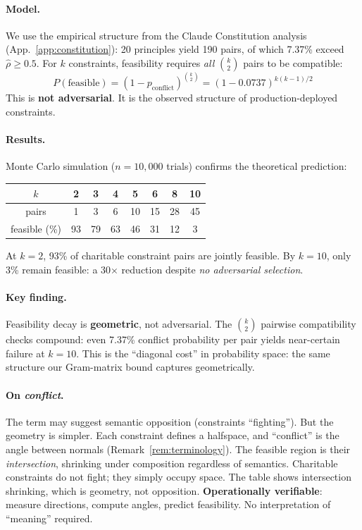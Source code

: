 \documentclass{article}
\theoremstyle{plain}
\theoremstyle{definition}
\theoremstyle{remark}
\newcommand{\rhohat}{\hat{\rho}}
\newcommand{\appref}[1]{App.~\ref{#1}}
\begin{document}
\paragraph{Model.} We use the empirical structure from the Claude Constitution analysis (\appref{app:constitution}): 20 principles yield 190 pairs, of which 7.37\% exceed $\rhohat \ge 0.5$. For $k$ constraints, feasibility requires \emph{all} $\binom{k}{2}$ pairs to be compatible:
\[
P(\text{feasible}) = (1 - p_{\text{conflict}})^{\binom{k}{2}} = (1 - 0.0737)^{k(k-1)/2}
\]
This is \textbf{not adversarial}. It is the observed structure of production-deployed constraints.

\paragraph{Results.} Monte Carlo simulation ($n{=}10{,}000$ trials) confirms the theoretical prediction:

\begin{center}
\begin{tabular}{c|ccccccc}
\toprule
$k$ & 2 & 3 & 4 & 5 & 6 & 8 & 10 \\
\midrule
pairs & 1 & 3 & 6 & 10 & 15 & 28 & 45 \\
feasible (\%) & 93 & 79 & 63 & 46 & 31 & 12 & 3 \\
\bottomrule
\end{tabular}
\end{center}

\noindent At $k{=}2$, 93\% of charitable constraint pairs are jointly feasible. By $k{=}10$, only 3\% remain feasible: a 30$\times$ reduction despite \emph{no adversarial selection}.

\paragraph{Key finding.} Feasibility decay is \textbf{geometric}, not adversarial. The $\binom{k}{2}$ pairwise compatibility checks compound: even 7.37\% conflict probability per pair yields near-certain failure at $k{=}10$. This is the ``diagonal cost'' in probability space: the same structure our Gram-matrix bound captures geometrically.

\paragraph{On \emph{conflict}.} The term may suggest semantic opposition (constraints ``fighting''). But the geometry is simpler. Each constraint defines a halfspace, and ``conflict'' is the angle between normals (Remark~\ref{rem:terminology}). The feasible region is their \emph{intersection}, shrinking under composition regardless of semantics. Charitable constraints do not fight; they simply occupy space. The table shows intersection shrinking, which is geometry, not opposition. \textbf{Operationally verifiable}: measure directions, compute angles, predict feasibility. No interpretation of ``meaning'' required.
\end{document}
